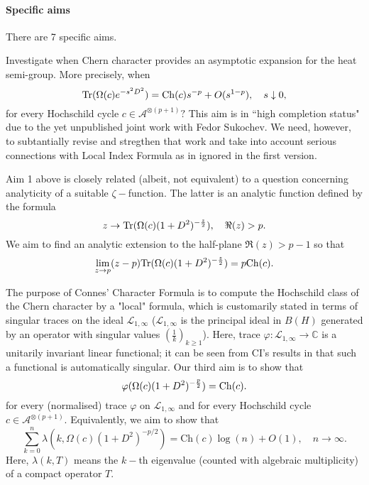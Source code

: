 \documentclass[12pt]{article}
\begin{document}



\paragraph*{Specific aims} There are 7 specific aims.


 Investigate when Chern character provides an asymptotic expansion for the heat semi-group. More precisely, when 
\begin{equation}\label{heat eq}
{\rm Tr}(\Omega(c)e^{-s^2D^2})={\rm Ch}(c)s^{-p}+O(s^{1-p}),\quad s\downarrow0,
\end{equation}
for every Hochschild cycle $c\in\mathcal{A}^{\otimes (p+1)}?$ This aim is in ``high completion status" due to the yet unpublished joint work with Fedor Sukochev. We need, however, to subtantially revise and stregthen that work and take into account serious connections with Local Index Formula as in \cite{ConnesMoscovici, CGRS} ignored in the first version.

 Aim 1 above is closely related (albeit, not equivalent) to a question concerning analyticity of a suitable $\zeta-$function. The latter is an analytic function defined by the formula
$$z\to {\rm Tr}(\Omega(c)(1+D^2)^{-\frac{z}{2}}),\quad \Re(z)>p.$$
We aim to find an analytic extension to the half-plane $\Re(z)>p-1$ so that
$$\lim_{z\to p}(z-p){\rm Tr}(\Omega(c)(1+D^2)^{-\frac{z}{2}})=p{\rm Ch}(c).$$

 The purpose of Connes' Character Formula is to compute the Hochschild class of the Chern character by a "local" formula, which is customarily  stated in terms of singular traces on the ideal $\mathcal{L}_{1,\infty}$ ($\mathcal{L}_{1,\infty}$ is the principal ideal in $B(H)$ generated by an operator with singular values $(\frac1k)_{k\geq1}$). Here, trace $\varphi:\mathcal{L}_{1,\infty}\to\mathbb{C}$ is a unitarily invariant linear functional; it can be seen from CI's results in \cite{book} that such a functional is automatically singular. Our third aim is to show that
\begin{equation}\label{super main eq}
\varphi(\Omega(c)(1+D^2)^{-\frac{p}{2}})={\rm Ch}(c).
\end{equation}
for every (normalised) trace $\varphi$ on $\mathcal{L}_{1,\infty}$ and for every Hochschild cycle $c\in\mathcal{A}^{\otimes (p+1)}.$ Equivalently, we aim to show that
$$\sum_{k=0}^n \lambda(k,\Omega(c)(1+D^2)^{-p/2}) = \mathrm{Ch}(c)\log(n)+O(1),\quad n\to\infty.$$
Here, $\lambda(k,T)$ means the $k-$th eigenvalue (counted with algebraic multiplicity) of a compact operator $T.$
\end{document}
